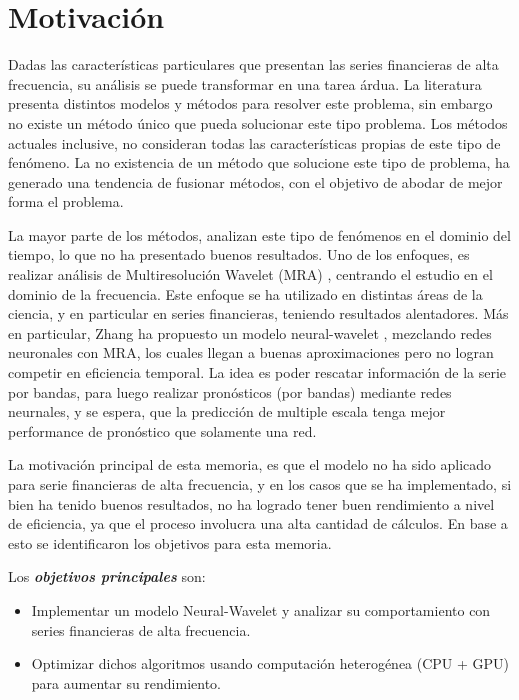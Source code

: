 \section{Motivación}

Dadas las características particulares que presentan las series financieras de alta frecuencia, su análisis se puede transformar en una tarea árdua. La literatura presenta distintos 
modelos y métodos para resolver este problema, sin embargo no existe un método único que pueda solucionar este tipo problema. Los métodos actuales inclusive, no consideran todas 
las características propias de este tipo de fenómeno. La no existencia de un método que solucione este tipo de problema, ha generado una tendencia de fusionar métodos, con el objetivo de 
abodar de mejor forma el problema.

La mayor parte de los métodos, analizan este tipo de fenómenos en el dominio del tiempo, lo que no ha presentado buenos resultados. 
Uno de los enfoques, es realizar análisis de Multiresolución Wavelet (MRA) \cite{benaouda2006wavelet}, centrando el estudio en el dominio de la frecuencia.  
Este enfoque se ha utilizado en distintas áreas de la ciencia, y en particular en series financieras, teniendo resultados alentadores. Más en particular, Zhang ha propuesto 
un modelo neural-wavelet \cite{zhang2001adaptive}, mezclando redes neuronales con MRA, los cuales llegan a buenas aproximaciones pero no logran competir 
en eficiencia temporal. La idea es poder rescatar información de la serie por bandas, para luego realizar pronósticos (por bandas) mediante redes neurnales, y se
espera, que la predicción de multiple escala tenga mejor performance de pronóstico que solamente una red. 

La motivación principal de esta memoria, es que el modelo no ha sido aplicado para serie financieras de alta frecuencia, y en los casos que se ha implementado, si bien ha 
tenido buenos resultados, no ha logrado tener buen rendimiento a nivel de eficiencia, ya que el proceso involucra una alta cantidad de cálculos. En base a esto se identificaron 
los objetivos para esta memoria.

Los \emph{\textbf{objetivos principales}} son:
\begin{itemize}
	\item Implementar un modelo Neural-Wavelet y analizar su comportamiento con series financieras de alta frecuencia.
	\item Optimizar dichos algoritmos usando computación heterogénea (CPU + GPU) para aumentar su rendimiento.
\end{itemize} 

